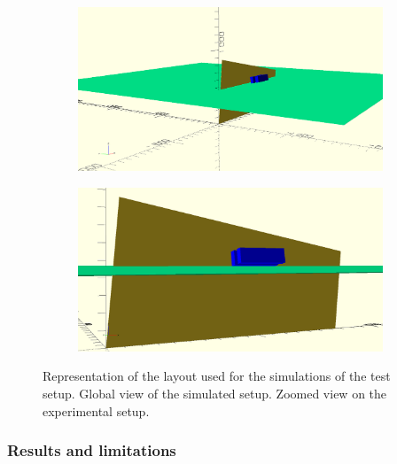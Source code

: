 	\begin{figure}[H]
		\begin{subfigure}{\linewidth}
			\centering
			\includegraphics[width = .9\linewidth]{fig/chapt5/GIFSetup-SimA.png}\\
			\caption{\label{fig:SimGIFLay:A}}
		\end{subfigure}
		\begin{subfigure}{\linewidth}
			\centering
			\includegraphics[width = .9\linewidth]{fig/chapt5/GIFSetup-SimB.png}
			\caption{\label{fig:SimGIFLay:B}}
		\end{subfigure}
		\caption{\label{fig:SimGIFLay} Representation of the layout used for the simulations of the test setup.  Global view of the simulated setup.  Zoomed view on the experimental setup.}
	\end{figure}

\newpage
		
		\subsubsection{Results and limitations}
		\label{chapt5:sssec:SimRes}
	
\begingroup\setlength{\intextsep}{5pt}\setlength{\columnsep}{15pt}
	
